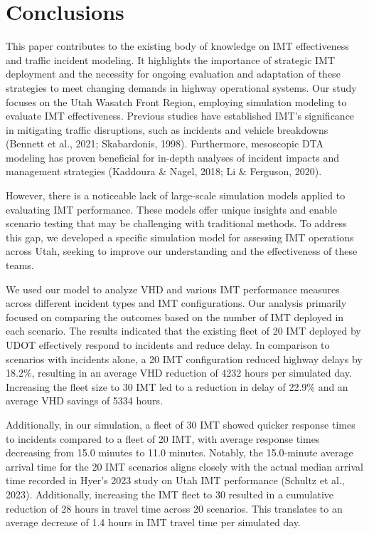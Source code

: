\documentclass[fancy, oneside, mastersfancy, ms]{byuthesis}
\begin{document}

\hypertarget{sec-conclusions}{%
\chapter{Conclusions}\label{sec-conclusions}}

This paper contributes to the existing body of knowledge on IMT
effectiveness and traffic incident modeling. It highlights the
importance of strategic IMT deployment and the necessity for ongoing
evaluation and adaptation of these strategies to meet changing demands
in highway operational systems. Our study focuses on the Utah Wasatch
Front Region, employing simulation modeling to evaluate IMT
effectiveness. Previous studies have established IMT's significance in
mitigating traffic disruptions, such as incidents and vehicle breakdowns
(Bennett et al., 2021; Skabardonis, 1998). Furthermore, mesoscopic DTA
modeling has proven beneficial for in-depth analyses of incident impacts
and management strategies (Kaddoura \& Nagel, 2018; Li \& Ferguson,
2020).

However, there is a noticeable lack of large-scale simulation models
applied to evaluating IMT performance. These models offer unique
insights and enable scenario testing that may be challenging with
traditional methods. To address this gap, we developed a specific
simulation model for assessing IMT operations across Utah, seeking to
improve our understanding and the effectiveness of these teams.

We used our model to analyze VHD and various IMT performance measures
across different incident types and IMT configurations. Our analysis
primarily focused on comparing the outcomes based on the number of IMT
deployed in each scenario. The results indicated that the existing fleet
of 20 IMT deployed by UDOT effectively respond to incidents and reduce
delay. In comparison to scenarios with incidents alone, a 20 IMT
configuration reduced highway delays by 18.2\%, resulting in an average
VHD reduction of 4232 hours per simulated day. Increasing the fleet size
to 30 IMT led to a reduction in delay of 22.9\% and an average VHD
savings of 5334 hours.

Additionally, in our simulation, a fleet of 30 IMT showed quicker
response times to incidents compared to a fleet of 20 IMT, with average
response times decreasing from 15.0 minutes to 11.0 minutes. Notably,
the 15.0-minute average arrival time for the 20 IMT scenarios aligns
closely with the actual median arrival time recorded in Hyer's 2023
study on Utah IMT performance (Schultz et al., 2023). Additionally,
increasing the IMT fleet to 30 resulted in a cumulative reduction of 28
hours in travel time across 20 scenarios. This translates to an average
decrease of 1.4 hours in IMT travel time per simulated day.
\end{document}
